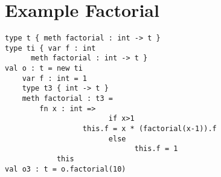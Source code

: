 \section{Example Factorial}
\begin{lstlisting}
type t { meth factorial : int -> t }
type ti { var f : int
	  meth factorial : int -> t }
val o : t = new ti
	var f : int = 1
	type t3 { int -> t }  
	meth factorial : t3 =
		fn x : int =>
                        if x>1 
			      this.f = x * (factorial(x-1)).f
                        else
                              this.f = 1
			this
val o3 : t = o.factorial(10)
\end{lstlisting}


